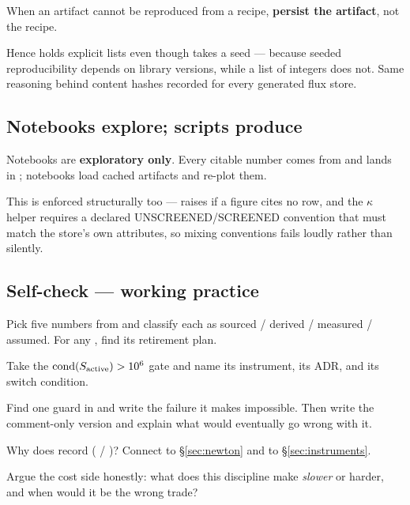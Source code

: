 \begin{invariant}
When an artifact cannot be reproduced from a recipe, \textbf{persist the
artifact}, not the recipe.
\end{invariant}

Hence  holds explicit
 lists even though  takes a seed ---
because seeded reproducibility depends on library versions, while a list of
integers does not. Same reasoning behind content hashes recorded for every
generated flux store.

\subsection{Notebooks explore; scripts produce}
\label{sec:notebooks}

Notebooks are \textbf{exploratory only}. Every citable number comes from
 and lands in ; notebooks load cached artifacts
and re-plot them.

This is enforced structurally too ---  raises if a
figure cites no  row, and the $\kappa$ helper requires a
declared UNSCREENED/SCREENED convention that must match the store's own
attributes, so mixing conventions fails loudly rather than silently.

\subsection*{Self-check --- working practice}
\label{sec:selfcheck-practice}

\begin{selfcheck}
\item Pick five numbers from  and classify each as sourced /
      derived / measured / assumed. For any , find its retirement
      plan.
\item Take the $\operatorname{cond}(S_{\mathrm{active}}) > 10^{6}$ gate and name its
      instrument, its ADR, and its switch condition.
\item Find one guard in  and write the failure it makes
      impossible. Then write the comment-only version and explain what would
      eventually go wrong with it.
\item Why does  record  ( /
      )? Connect to \S\ref{sec:newton} and to
      \S\ref{sec:instruments}.
\item Argue the cost side honestly: what does this discipline make \emph{slower}
      or harder, and when would it be the wrong trade?
\end{selfcheck}
